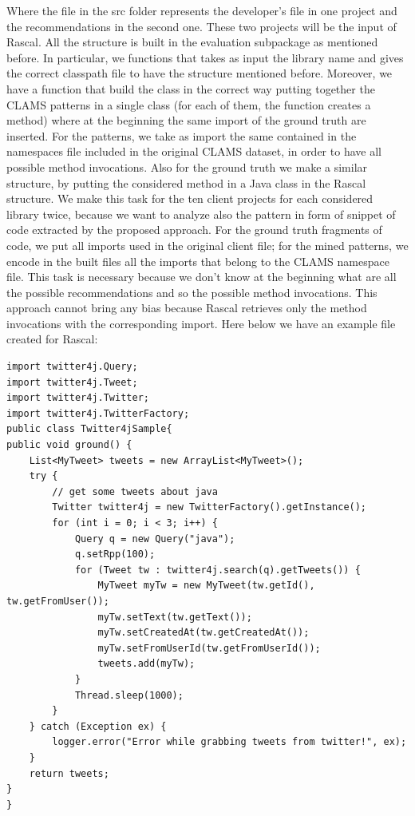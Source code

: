 Where the file in the src folder represents the developer's file in one project and the recommendations in the second one. These two projects will be the input of Rascal. All the structure is built in the evaluation subpackage as mentioned before. In particular, we functions that takes as input the library name and gives the correct classpath file to have the structure mentioned before. Moreover, we have a function that build the class in the correct way putting together the CLAMS patterns in a single class (for each of them, the function creates a method) where at the beginning the same import of the ground truth are inserted. For the patterns, we take as import the same contained in the namespaces file included in the original CLAMS dataset, in order to have all possible method invocations. Also for the ground truth we make a similar structure, by putting the considered method in a Java class in the Rascal structure. We make this task for the ten client projects for each considered library twice, because we want to analyze also the pattern in form of snippet of code extracted by the proposed approach. For the ground truth fragments of code, we put all imports used in the original client file; for the mined patterns, we encode in the built files all the imports that belong to the CLAMS namespace file. This task is necessary because we don't know at the beginning what are all the possible recommendations and so the possible method invocations. This approach cannot bring any bias because Rascal retrieves only the method invocations with the corresponding import. Here below we have an example file created for Rascal:
\begin{lstlisting}
import twitter4j.Query;
import twitter4j.Tweet;
import twitter4j.Twitter;
import twitter4j.TwitterFactory;
public class Twitter4jSample{
public void ground() {
    List<MyTweet> tweets = new ArrayList<MyTweet>();
    try {
        // get some tweets about java
        Twitter twitter4j = new TwitterFactory().getInstance();
        for (int i = 0; i < 3; i++) {
            Query q = new Query("java");
            q.setRpp(100);
            for (Tweet tw : twitter4j.search(q).getTweets()) {
                MyTweet myTw = new MyTweet(tw.getId(), tw.getFromUser());
                myTw.setText(tw.getText());
                myTw.setCreatedAt(tw.getCreatedAt());
                myTw.setFromUserId(tw.getFromUserId());
                tweets.add(myTw);
            }
            Thread.sleep(1000);
        }
    } catch (Exception ex) {
        logger.error("Error while grabbing tweets from twitter!", ex);
    }
    return tweets;
}
}
\end{lstlisting}
